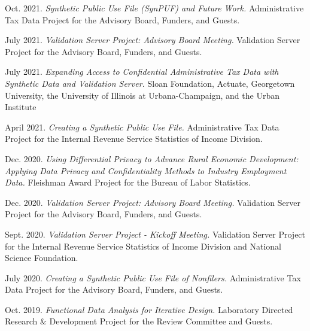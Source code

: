 \begin{etaremune}[topsep=0pt, itemsep=3pt, partopsep=0pt, parsep=0pt]
    \item Oct. 2021. \textit{Synthetic Public Use File (SynPUF) and Future Work.} Administrative Tax Data Project for the Advisory Board, Funders, and Guests.
    
    \item July 2021. \textit{Validation Server Project: Advisory Board Meeting.} Validation Server Project for the Advisory Board, Funders, and Guests.
    
    \item July 2021. \textit{Expanding Access to Confidential Administrative Tax Data with Synthetic Data and Validation Server.} Sloan Foundation, Actuate, Georgetown University, the University of Illinois at Urbana-Champaign, and the Urban Institute
    
    \item April 2021. \textit{Creating a Synthetic Public Use File.} Administrative Tax Data Project for the Internal Revenue Service Statistics of Income Division.

    \item Dec. 2020. \textit{Using Differential Privacy to Advance Rural Economic Development: Applying Data Privacy and Confidentiality Methods to Industry Employment Data.} Fleishman Award Project for the Bureau of Labor Statistics.
    
    \item Dec. 2020. \textit{Validation Server Project: Advisory Board Meeting.} Validation Server Project for the Advisory Board, Funders, and Guests.
    
    \item Sept. 2020. \textit{Validation Server Project - Kickoff Meeting.} Validation Server Project for the Internal Revenue Service Statistics of Income Division and National Science Foundation.
    
    \item July 2020. \textit{Creating a Synthetic Public Use File of Nonfilers.} Administrative Tax Data Project for the Advisory Board, Funders, and Guests.
    
    \item Oct. 2019. \textit{Functional Data Analysis for Iterative Design.} Laboratory Directed Research \& Development Project for the Review Committee and Guests.
\end{etaremune}
